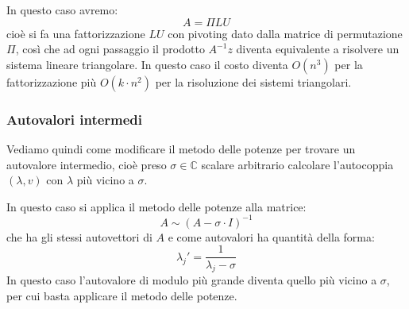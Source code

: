 \documentclass[a4paper,11pt]{article}
\begin{document}
In questo caso avremo:
$$
A = \Pi LU
$$
cioè si fa una fattorizzazione $LU$ con pivoting dato dalla matrice di permutazione $\Pi$, così che ad ogni passaggio il prodotto $A^{-1} z$ diventa equivalente a risolvere un sistema lineare triangolare.
In questo caso il costo diventa $O(n^3)$ per la fattorizzazione più $O(k \cdot n^2)$ per la risoluzione dei sistemi triangolari.

\subsubsection{Autovalori intermedi}
Vediamo quindi come modificare il metodo delle potenze per trovare un autovalore intermedio, cioè preso $\sigma \in \mathbb{C}$ scalare arbitrario calcolare l'autocoppia $(\lambda, v)$ con $\lambda$ più vicino a $\sigma$.

In questo caso si applica il metodo delle potenze alla matrice:
$$
A \sim (A - \sigma \cdot I)^{-1}
$$
che ha gli stessi autovettori di $A$ e come autovalori ha quantità della forma:
$$
\lambda_j' = \frac{1}{\lambda_j - \sigma}
$$
In questo caso l'autovalore di modulo più grande diventa quello più vicino a $\sigma$, per cui basta applicare il metodo delle potenze.
\end{document}

